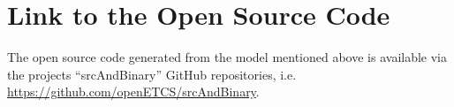 \documentclass{template/openetcs_article}
\begin{document}
\section{Link to the Open Source Code}

The open source code generated from the model mentioned above is available via the projects ``srcAndBinary'' GitHub repositories, i.e. \url{https://github.com/openETCS/srcAndBinary}.



\end{document}
